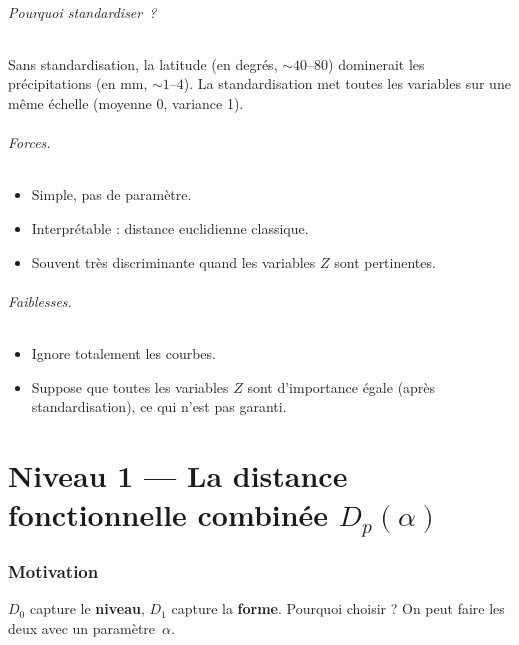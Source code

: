 \documentclass[11pt, a4paper]{article}
\newcommand{\Dp}{D_p}
\theoremstyle{definition}
\theoremstyle{remark}
\begin{document}
\paragraph{Pourquoi standardiser~?}
Sans standardisation, la latitude (en degrés, $\sim\!40\text{--}80$) dominerait
les précipitations (en mm, $\sim\!1\text{--}4$). La standardisation met toutes
les variables sur une même échelle (moyenne 0, variance 1).

\paragraph{Forces.}
\begin{itemize}[nosep]
  \item Simple, pas de paramètre.
  \item Interprétable : distance euclidienne classique.
  \item Souvent très discriminante quand les variables $Z$ sont pertinentes.
\end{itemize}

\paragraph{Faiblesses.}
\begin{itemize}[nosep]
  \item Ignore totalement les courbes.
  \item Suppose que toutes les variables $Z$ sont d'importance égale (après
    standardisation), ce qui n'est pas garanti.
\end{itemize}

\newpage
\part{Niveau 1 — La distance fonctionnelle combinée $\Dp(\alpha)$}

\section{Motivation}

$D_0$ capture le \textbf{niveau}, $D_1$ capture la \textbf{forme}. Pourquoi
choisir ? On peut faire les deux avec un paramètre~$\alpha$.
\end{document}

